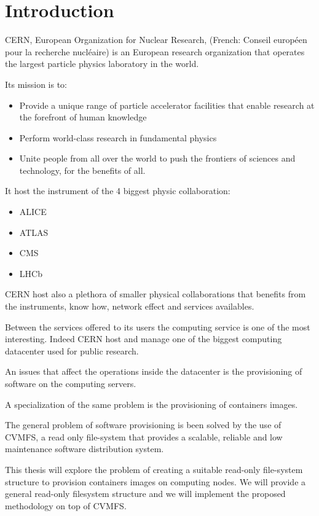 \chapter{Introduction}\label{ch:introduction}

CERN, European Organization for Nuclear Research, (French: Conseil européen pour la recherche nucléaire) is an European research organization that operates the largest particle physics laboratory in the world.

Its mission is to:
\begin{itemize}
	\item Provide a unique range of particle accelerator facilities that enable research at the forefront of human knowledge
	\item Perform world-class research in fundamental physics
	\item Unite people from all over the world to push the frontiers of sciences and technology, for the benefits of all.
\end{itemize}

It host the instrument of the 4 biggest physic collaboration: 
\begin{itemize}
\item ALICE
\item ATLAS
\item CMS
\item LHCb
\end{itemize}

CERN host also a plethora of smaller physical collaborations that benefits from the instruments, know how, network effect and services availables.

Between the services offered to its users the computing service is one of the most interesting. Indeed CERN host and manage one of the biggest computing datacenter used for public research.

An issues that affect the operations inside the datacenter is the provisioning of software on the computing servers.

A specialization of the same problem is the provisioning of containers images.

The general problem of software provisioning is been solved by the use of CVMFS, a read only file-system that provides a scalable, reliable and low maintenance software distribution system.

This thesis will explore the problem of creating a suitable read-only file-system structure to provision containers images on computing nodes. We will provide a general read-only filesystem structure and we will implement the proposed methodology on top of CVMFS.

